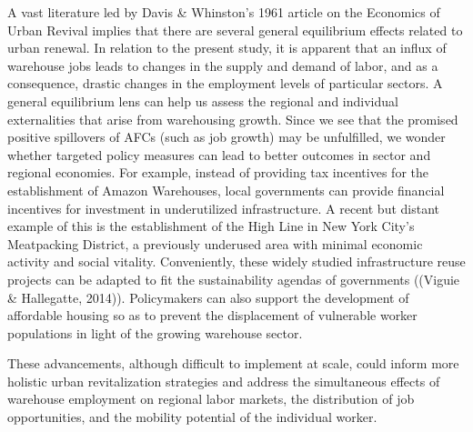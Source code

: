 \documentclass[11pt]{article}
\begin{document}
\begin{text}
\-\hspace{0.5cm} A vast literature led by Davis \& Whinston's 1961 article on the Economics of Urban Revival implies that there are several general equilibrium effects related to urban renewal. In relation to the present study, it is apparent that an influx of warehouse jobs leads to changes in the supply and demand of labor, and as a consequence, drastic changes in the employment levels of particular sectors. A general equilibrium lens can help us assess the regional and individual externalities that arise from warehousing growth. Since we see that the promised positive spillovers of AFCs (such as job growth) may be unfulfilled, we wonder whether targeted policy measures can lead to better outcomes in sector and regional economies. For example, instead of providing tax incentives for the establishment of Amazon Warehouses, local governments can provide financial incentives for investment in underutilized infrastructure. A recent but distant example of this is the establishment of the High Line in New York City's Meatpacking District, a previously underused area with minimal economic activity and social vitality. Conveniently, these widely studied infrastructure reuse projects can be adapted to fit the sustainability agendas of governments ((Viguie \& Hallegatte, 2014)). Policymakers can also support the development of affordable housing so as to prevent the displacement of vulnerable worker populations in light of the growing warehouse sector. 

\-\hspace{0.5cm} These advancements, although difficult to implement at scale, could inform more holistic urban revitalization strategies and address the simultaneous effects of warehouse employment on regional labor markets, the distribution of job opportunities, and the mobility potential of the individual worker. 

\end{text}

\clearpage
\end{document}
